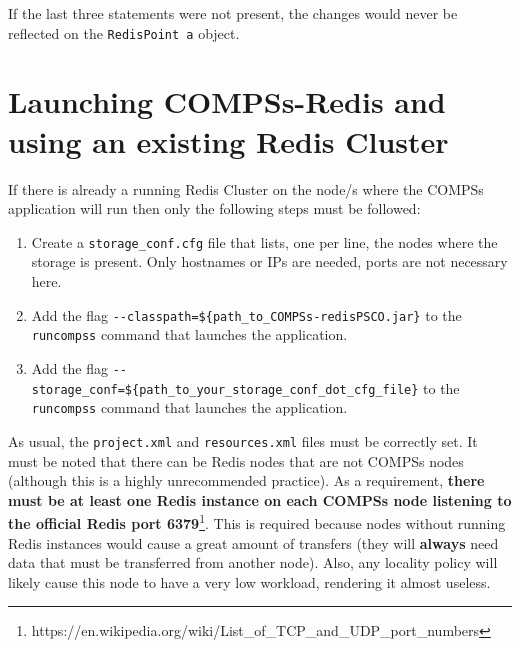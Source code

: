 \documentclass{article}
\begin{document}
  If the last three statements were not present, the changes would never be reflected on the \verb|RedisPoint a| object.
  \section{Launching COMPSs-Redis and using an existing Redis Cluster}
  If there is already a running Redis Cluster on the node/s where the COMPSs application will run then only the following steps must be followed:
  \begin{enumerate}
  \item Create a \verb|storage_conf.cfg| file that lists, one per line, the nodes where the storage is present. Only hostnames or IPs are needed, ports are not necessary here.
  \item Add the flag \verb|--classpath=${path_to_COMPSs-redisPSCO.jar}| to the \verb|runcompss| command that launches the application.
  \item Add the flag \verb|--storage_conf=${path_to_your_storage_conf_dot_cfg_file}| to the \verb|runcompss| command that launches the application.
  \end{enumerate}
  As usual, the \verb|project.xml| and \verb|resources.xml| files must be correctly set. It must be noted that there can be Redis nodes that are not COMPSs nodes (although this is a highly unrecommended practice).
  As a requirement, \textbf{there must be at least one Redis instance on each COMPSs node listening to the official Redis port 6379}\footnote{https://en.wikipedia.org/wiki/List\_of\_TCP\_and\_UDP\_port\_numbers}. This is required because nodes without running Redis instances would cause a great amount of transfers (they will \textbf{always} need data that must be transferred from another node). Also, any locality policy will likely cause this node to have a very low workload, rendering it almost useless.
\end{document}
